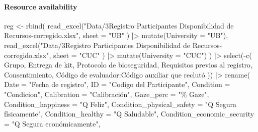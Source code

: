 \documentclass[
  bookmarksnumbered]{article}
\newenvironment{Shaded}{\begin{snugshade}}{\end{snugshade}}
\newcommand{\AttributeTok}[1]{\textcolor[rgb]{0.80,0.80,0.80}{#1}}
\newcommand{\FunctionTok}[1]{\textcolor[rgb]{0.94,0.94,0.56}{#1}}
\newcommand{\NormalTok}[1]{\textcolor[rgb]{0.80,0.80,0.80}{#1}}
\newcommand{\OtherTok}[1]{\textcolor[rgb]{0.94,0.94,0.56}{#1}}
\newcommand{\SpecialCharTok}[1]{\textcolor[rgb]{0.86,0.64,0.64}{#1}}
\newcommand{\StringTok}[1]{\textcolor[rgb]{0.80,0.58,0.58}{#1}}
\begin{document}
\paragraph{Resource availability}\label{resource-availability}

\begin{Shaded}
\begin{Highlighting}[]
\NormalTok{reg }\OtherTok{\textless{}{-}} \FunctionTok{rbind}\NormalTok{(}
  \FunctionTok{read\_excel}\NormalTok{(}\StringTok{"Data/3Registro Participantes Disponibilidad de Recursos{-}corregido.xlsx"}\NormalTok{,}
             \AttributeTok{sheet =} \StringTok{"UB"}
\NormalTok{  ) }\SpecialCharTok{|\textgreater{}}
    \FunctionTok{mutate}\NormalTok{(}\AttributeTok{University =} \StringTok{"UB"}\NormalTok{),}
  \FunctionTok{read\_excel}\NormalTok{(}\StringTok{"Data/3Registro Participantes Disponibilidad de Recursos{-}corregido.xlsx"}\NormalTok{,}
             \AttributeTok{sheet =} \StringTok{"CUC"}
\NormalTok{  ) }\SpecialCharTok{|\textgreater{}}
    \FunctionTok{mutate}\NormalTok{(}\AttributeTok{University =} \StringTok{"CUC"}\NormalTok{)}
\NormalTok{) }\SpecialCharTok{|\textgreater{}}
  \FunctionTok{select}\NormalTok{(}\SpecialCharTok{{-}}\FunctionTok{c}\NormalTok{(}
\NormalTok{    Grupo, }\StringTok{\textasciigrave{}}\AttributeTok{Entrega de kit}\StringTok{\textasciigrave{}}\NormalTok{, }\StringTok{\textasciigrave{}}\AttributeTok{Protocolo de bioseguridad}\StringTok{\textasciigrave{}}\NormalTok{, }\StringTok{\textasciigrave{}}\AttributeTok{Requisitos previos al registro}\StringTok{\textasciigrave{}}\NormalTok{, }
\NormalTok{    Consentimiento, }\StringTok{\textasciigrave{}}\AttributeTok{Código de evaluador}\StringTok{\textasciigrave{}}\SpecialCharTok{:}\StringTok{\textasciigrave{}}\AttributeTok{Código auxiliar que reclutó}\StringTok{\textasciigrave{}}
\NormalTok{  )) }\SpecialCharTok{|\textgreater{}}
  \FunctionTok{rename}\NormalTok{(}
    \AttributeTok{Date =} \StringTok{"Fecha de registro"}\NormalTok{,}
    \AttributeTok{ID =} \StringTok{"Codigo del Participante"}\NormalTok{,}
    \AttributeTok{Condition =} \StringTok{"Condicion"}\NormalTok{,}
    \AttributeTok{Calibration =} \StringTok{"Calibración"}\NormalTok{,}
    \AttributeTok{Gaze\_perc =} \StringTok{"\% Gaze"}\NormalTok{,}
    \AttributeTok{Condition\_happiness =} \StringTok{"Q Feliz"}\NormalTok{,}
    \AttributeTok{Condition\_physical\_safety =} \StringTok{"Q Segura físicamente"}\NormalTok{,}
    \AttributeTok{Condition\_healthy =} \StringTok{"Q Saludable"}\NormalTok{,}
    \AttributeTok{Condition\_economic\_security =} \StringTok{"Q Segura económicamente"}\NormalTok{,}

\end{Highlighting}
\end{Shaded}
\end{document}
